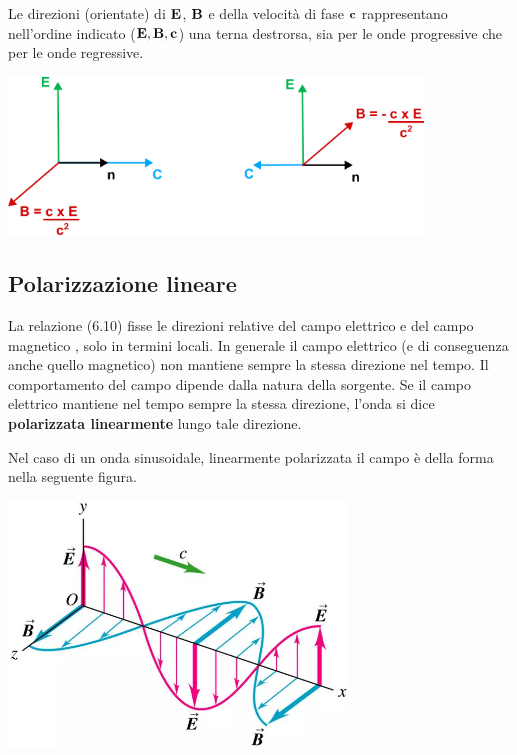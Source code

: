 \begin{center}
\end{center}
Le direzioni (orientate) di $\bold{E}$, $\bold{B}$ e della velocit\`a di fase $\bold{c}$ rappresentano nell'ordine indicato ($\bold{E},\bold{B},\bold{c}$) una terna destrorsa, sia per le onde progressive che per le onde regressive.

\begin{center}
	\includegraphics[width = 11cm]{images/nxe}
\end{center} 

\subsection{Polarizzazione lineare}

La relazione (6.10) fisse le direzioni relative del campo elettrico e del campo magnetico , solo in termini locali. In generale il campo elettrico (e di conseguenza anche quello magnetico) non mantiene sempre la stessa direzione nel tempo. Il comportamento del campo dipende dalla natura della sorgente. Se il campo elettrico mantiene nel tempo sempre la stessa direzione, l'onda si dice \textbf{polarizzata linearmente} lungo tale direzione.

Nel caso di un onda sinusoidale, linearmente polarizzata il campo \`e della forma nella seguente figura.
\begin{center}
	\includegraphics[width = 9cm]{images/linear_pol}
\end{center}

